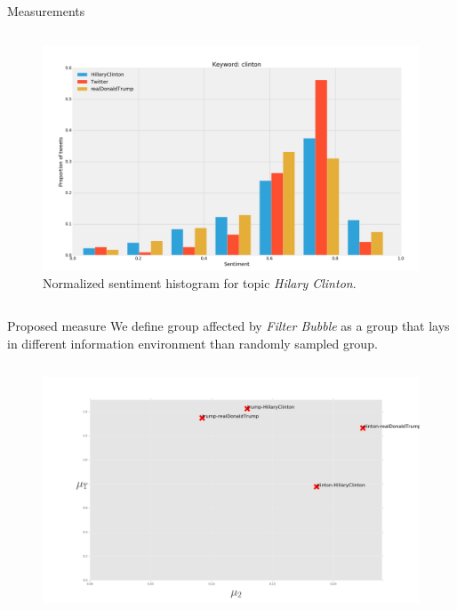 \documentclass{beamer}
\begin{document}
\begin{frame}[fragile]
\begin{columns}[T]
\begin{column}{.63\textwidth}
\begin{block}{Measurements}
\begin{columns}
\begin{figure}
                \centering
                \captionsetup{justification=centering,margin=2cm}
                \includegraphics[scale=0.5]{./Pics/hist-clinton.png}
                \caption*{Normalized sentiment histogram for topic \textit{Hilary Clinton}.}
            \end{figure}
    \end{columns}
\end{block}
\begin{block}{Proposed measure}
    We define group affected by \textit{Filter Bubble} as a group that lays in different information environment than randomly sampled group.
    \vspace{-2cm}
    \begin{columns}
            \begin{figure}
                \centering
                \captionsetup{justification=centering,margin=1cm}
                \includegraphics[scale=0.585]{./Pics/metric-L2-1Q.png}

\end{figure}
\end{columns}
\end{block}
\end{column}
\end{columns}
\end{frame}
\end{document}
